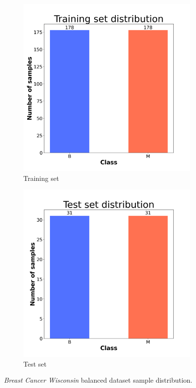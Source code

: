 \begin{figure}[H]
    \centering
    \begin{subfigure}[t]{0.45\textwidth}
        \centering
        \includegraphics[width=1\textwidth]{images/exper1/breast/train_dist.png}
        \caption{Training set}
    \end{subfigure}
    \begin{subfigure}[t]{0.45\textwidth}
        \centering
        \includegraphics[width=1\textwidth]{images/exper1/breast/test_dist.png}
        \caption{Test set}
    \end{subfigure}
    \caption{\textit{Breast Cancer Wisconsin} balanced dataset sample distribution.}
\end{figure}

